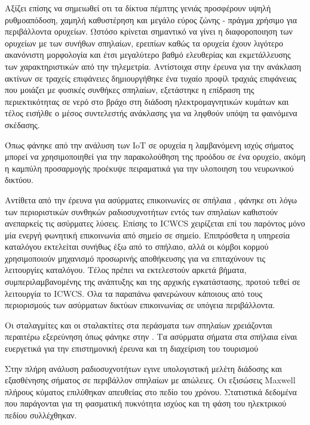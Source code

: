 \documentclass[12pt, greek]{article}
\begin{document}
\begin{multicols*}{2}
        Αξίζει επίσης να σημειωθεί οτι τα δίκτυα πέμπτης γενιάς προσφέρουν υψηλή ρυθμοαπόδοση,
        χαμηλή καθυστέρηση και μεγάλο εύρος ζώνης - πράγμα χρήσιμο για περιβάλλοντα ορυχείων.
        Ωστόσο κρίνεται σημαντικό να γίνει η διαφοροποιηση των ορυχείων με των συνήθων σπηλαίων,
        ερειπίων καθώς τα ορυχεία έχουν λιγότερο ακανόνιστη μορφολογία και έτσι μεγαλύτερο βαθμό
        ελευθερίας και εκμετάλλευσης των χαρακτηριστικών από την τηλεμετρία. Αντίστοιχα στην έρευνα
        για την ανάκλαση ακτίνων σε τραχείς επιφάνειες \cite{soo_investigation_2018} δημιουργήθηκε
        ένα τυχαίο προφίλ τραχιάς επιφάνειας που μοιάζει με φυσικές συνθήκες σπηλαίων, εξετάστηκε
        η επίδραση της περιεκτικότητας σε νερό στο βράχο στη διάδοση ηλεκτρομαγνητικών κυμάτων και
        τέλος εισήλθε ο μέσος συντελεστής ανάκλασης για να ληφθούν υπόψη τα φαινόμενα σκέδασης.

        Όπως φάνηκε από την ανάλυση των IoT σε ορυχεία \cite{ming_study_2019} η λαμβανόμενη ισχύς
        σήματος μπορεί να χρησιμοποιηθεί για την παρακολούθηση της προόδου σε ένα ορυχείο, ακόμη 
        η καμπύλη προσαρμογής προέκυψε πειραματικά για την υλοποιηση του νευρωνικού δικτύου.

        Αντίθετα από την έρευνα για ασύρματες επικοινωνίες σε σπήλαια \cite{yavuz_-cave_2009},
        φάνηκε οτι λόγω των περιοριστικών συνθηκών ραδιοσυχνοτήτων εντός των σπηλαίων καθιστούν
        ανεπαρκείς τις ασύρματες λύσεις. Επίσης το ICWCS χειρίζεται επί του παρόντος μόνο μία
        ενεργή φωνητική επικοινωνία από σημείο σε σημείο. Επιπρόσθετα η υπηρεσία καταλόγου
        εκτελείται συνήθως έξω από το σπήλαιο, αλλά οι κόμβοι κορμού χρησιμοποιούν μηχανισμό
        προσωρινής αποθήκευσης για να επιταχύνουν τις λειτουργίες καταλόγου. Τέλος πρέπει να
        εκτελεστούν αρκετά βήματα, συμπεριλαμβανομένης της ανάπτυξης και της αρχικής εγκατάστασης,
        προτού τεθεί σε λειτουργία το ICWCS. Όλα τα παραπάνω φανερώνουν κάποιους από τους
        περιορισμούς των ασύρματων δικτύων επικοινωνίας σε υπόγεια περιβάλλοντα.

        Οι σταλαγμίτες και οι σταλακτίτες στα περάσματα των σπηλαίων χρειάζονται περαιτέρω
        εξερεύνηση όπως φάνηκε στην \cite{soo_propagation_2018}.
        Τα ασύρματα σήματα στα σπήλαια είναι ευεργετικά για την επιστημονική έρευνα και τη 
        διαχείριση του τουρισμού

        Στην πλήρη ανάλυση ραδιοσυχνοτήτων \cite{pingenot_full_2005} εγινε υπολογιστική μελέτη
        διάδοσης και εξασθένησης σήματος σε περιβάλλον σπηλαίων με απώλειες. Οι εξισώσεις Maxwell
        πλήρους κύματος επιλύθηκαν απευθείας στο πεδίο του χρόνου. Στατιστικά δεδομένα που παράγονται
        για τη φασματική πυκνότητα ισχύος και τη φάση του ηλεκτρικού πεδίου συλλέχθηκαν.


\end{multicols*}
\end{document}
